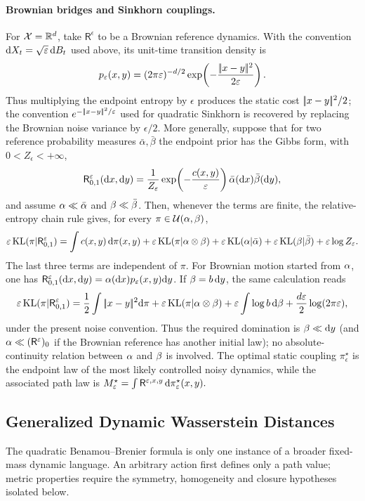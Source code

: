 \paragraph{Brownian bridges and Sinkhorn couplings.}
For $\mathcal{X}=\mathbb{R}^d$, take $\mathsf R^\epsilon$ to be a Brownian reference dynamics. With the convention $\mathrm{d} X_t=\sqrt{\varepsilon}\,\mathrm{d} B_t$ used above, its unit-time transition density is
\[
p_\varepsilon(x,y)
=
(2\pi\varepsilon)^{-d/2}
\exp\!\left(-\frac{|\!| x-y |\!|^2}{2\varepsilon}\right).
\]
Thus multiplying the endpoint entropy by $\epsilon$ produces the static cost $|\!| x-y |\!|^2/2$; the convention $e^{-|\!| x-y |\!|^2/\varepsilon}$ used for quadratic Sinkhorn is recovered by replacing the Brownian noise variance by $\epsilon/2$. More generally, suppose that for two reference probability measures $\bar\alpha,\bar\beta$ the endpoint prior has the Gibbs form, with $0<Z_\epsilon<+\infty$,
\[
\mathsf R^\varepsilon_{0,1}(\mathrm{d} x,\mathrm{d} y)
=
\frac1{Z_\varepsilon}
\exp\!\left(-\frac{c(x,y)}{\varepsilon}\right)
\bar\alpha(\mathrm{d} x)\bar\beta(\mathrm{d} y),
\]
and assume $\alpha\ll\bar\alpha$ and $\beta\ll\bar\beta$. Then, whenever the terms are finite, the relative-entropy chain rule gives, for every $\pi\in\mathcal{U}(\alpha,\beta)$,
\[
\varepsilon\operatorname{KL}(\pi|\mathsf R^\varepsilon_{0,1})
=
\int c(x,y)\,\mathrm{d}\pi(x,y)
+
\varepsilon\operatorname{KL}(\pi|\alpha\otimes\beta)
+
\varepsilon\operatorname{KL}(\alpha|\bar\alpha)
+
\varepsilon\operatorname{KL}(\beta|\bar\beta)
+
\varepsilon\log Z_\varepsilon.
\]
The last three terms are independent of $\pi$. For Brownian motion started from $\alpha$, one has $\mathsf R^\varepsilon_{0,1}(\mathrm{d} x,\mathrm{d} y)=\alpha(\mathrm{d} x)p_\varepsilon(x,y)\mathrm{d} y$. If $\beta=b\,\mathrm{d} y$, the same calculation reads
\[
\varepsilon\operatorname{KL}(\pi|\mathsf R^\varepsilon_{0,1})
=
\frac12\int|\!| x-y |\!|^2\mathrm{d}\pi
+
\varepsilon\operatorname{KL}(\pi|\alpha\otimes\beta)
+
\varepsilon\int\log b\,\mathrm{d}\beta
+
\frac{d\varepsilon}{2}\log(2\pi\varepsilon),
\]
under the present noise convention. Thus the required domination is $\beta\ll\mathrm{d} y$ (and $\alpha\ll(\mathsf R^\varepsilon)_0$ if the Brownian reference has another initial law); no absolute-continuity relation between $\alpha$ and $\beta$ is involved. The optimal static coupling $\pi_\epsilon^\star$ is the endpoint law of the most likely controlled noisy dynamics, while the associated path law is
\(M_\varepsilon^\star = \int \mathsf R^{\varepsilon,x,y}\,\mathrm{d}\pi_\varepsilon^\star(x,y).\)
\subsection{Generalized Dynamic Wasserstein Distances}
\label{sec-bb-extensions}
\label{sec-generalized-dynamic-wasserstein-distances}
The quadratic Benamou--Brenier formula is only one instance of a broader fixed-mass dynamic language. An arbitrary action first defines only a path value; metric properties require the symmetry, homogeneity and closure hypotheses isolated below.

